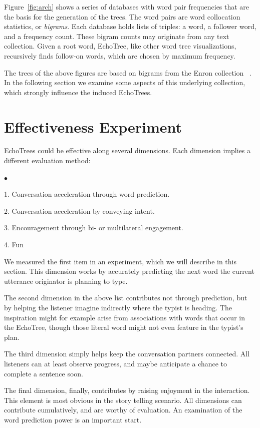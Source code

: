 \documentclass{sigchi}
\newcommand{\squishlist}{
 \begin{list}{$\bullet$}
 {
  \setlength{\itemsep}{0pt}
  \setlength{\parsep}{0pt}   %
  \setlength{\topsep}{0pt}   %
  \setlength{\partopsep}{0pt}
  \setlength{\leftmargin}{1.5em}
  \setlength{\labelwidth}{1em}
  \setlength{\labelsep}{0.5em} } }
\newcommand{\squishend}{
  \end{list}  }
\begin{document}
Figure~\ref{fig:arch} shows a series of databases with word pair
frequencies that are the basis for the generation of the trees. The
word pairs are word collocation statistics, or {\em bigrams}.  Each
database holds lists of triples: a word, a follower word, and a
frequency count. These bigram counts may originate from any text
collection. Given a root word, EchoTree, like other word tree
visualizations, recursively finds follow-on words, which are chosen by
maximum frequency.

The trees of the above figures are based on bigrams from the Enron
collection ~\cite{enron}. In the following section we examine some
aspects of this underlying collection, which strongly influence the
induced EchoTrees.

\section{Effectiveness Experiment}
EchoTrees could be effective along several dimensions. Each dimension
implies a different evaluation method:
\squishlist
\item[1.] Conversation acceleration through word prediction.
\item[2.] Conversation acceleration by conveying intent.
\item[3.] Encouragement through bi- or multilateral engagement.
\item[4.] Fun
\squishend
We measured the first item in an experiment, which we will describe in
this section. This dimension works by accurately predicting the next
word the current utterance originator is planning to type.

The second dimension in the above list contributes not through
prediction, but by helping the listener imagine indirectly where the
typist is heading. The inspiration might for example arise from
associations with words that occur in the EchoTree, though those
literal word might not even feature in the typist's plan.

The third dimension simply helps keep the conversation partners
connected. All listeners can at least observe progress, and maybe
anticipate a chance to complete a sentence soon.

The final dimension, finally, contributes by raising enjoyment in the
interaction. This element is most obvious in the story telling
scenario. All dimensions can contribute cumulatively, and are worthy
of evaluation. An examination of the word prediction power is an
important start. 
\end{document}

